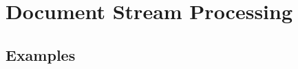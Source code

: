 \section{Document Stream Processing}
\label{sec:document-stram-processing}

\subsection{Examples}
\label{Riado_Lyaer_RL}
